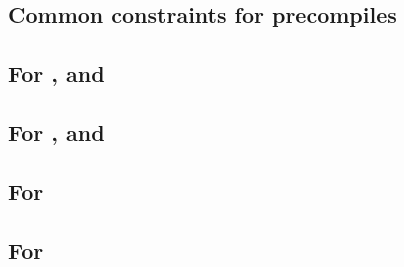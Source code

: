 \subsection{Common constraints for precompiles}                            \label{oob: precompiles: common precompiles: generalities}           \newpage
\subsection{For \oobInstEcrecover{}, \oobInstEcadd{} and \oobInstEcmul{}}  \label{oob: precompiles: common precompiles: one row precompiles}             \newpage
\subsection{For \oobInstShaTwo{}, \oobInstRipemd{} and \oobInstIdentity{}} \label{oob: precompiles: common precompiles: two row precompiles}             \newpage
\subsection{For \oobInstEcpairing{}}                                       \label{oob: precompiles: common precompiles: three row precompiles}           \newpage
\subsection{For \oobInstPointEvaluation{}}                                 \label{oob: precompiles: common precompiles: point evaluation}          \newpage
